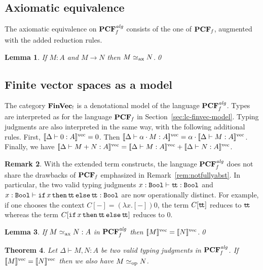 \documentclass[10pt]{article}
\theoremstyle{plain}
\newtheorem{theorem}{Theorem}
\newtheorem{lemma}[theorem]{Lemma}
\theoremstyle{definition}
\newtheorem{remark}[theorem]{Remark}
\newcommand{\entail}{\vdash}
\newcommand{\FinVec}{\mbox{\bf FinVec}}
\newcommand{\ttrue}{{\tt t}\!{\tt t}}
\newcommand{\ifterm}[3]{{{\tt if}\,{#1}\,{\tt then}\,{#2}\,{\tt else}\,{#3}}}
\newcommand{\bit}{{\tt Bool}}
\newcommand{\opeq}{\mathrel{\simeq_{\rm op}}}
\newcommand{\axeq}{\mathrel{\simeq_{\rm ax}}}
\newcommand{\fvdenot}[1]{{[\![{#1}]\!]^{\rm vec}}}
\begin{document}
\subsection{Axiomatic equivalence}

The axiomatic equivalence on ${\bf PCF}_{\it f}^{\it alg}$ consists of the one
of ${\bf PCF}_{\it f}$, augmented with the added reduction rules. 


\begin{lemma}
  \label{lem:opax-alg}
  If $M:A$ and $M\to N$ then $M\axeq N$.\qed
\end{lemma}




\subsection{Finite vector spaces as a model}
\label{sec:model-alglc}

The category $\FinVec_!$ is a denotational model of the language
${\bf PCF}_{\it f}^{\it alg}$. Types are interpreted as for the language
${\bf PCF}_{\it f}$ in Section~\ref{sec:lc-finvec-model}. Typing judgments are
also interpreted in the same way, with the following additional
rules. First,
$\fvdenot{\Delta\entail 0:A} = 0$. Then $\fvdenot{\Delta\entail \alpha\cdot M:A} = \alpha\cdot
  \fvdenot{\Delta\entail M:A}$. Finally, we have
$\fvdenot{\Delta\entail M+N:A} = \fvdenot{\Delta\entail M:A} + \fvdenot{\Delta\entail N:A}$.

\begin{remark}
With the extended term constructs, the language ${\bf PCF}_{\it f}^{\it alg}$
does not share the drawbacks of ${\bf PCF}_{\it f}$ emphasized in
Remark~\ref{rem:notfullyabst}. In particular, the two valid typing
judgments $ x:\bit\entail\ttrue:\bit $ and $
x:\bit\entail\ifterm{x}{\ttrue}{\ttrue}:\bit $ are now operationally
distinct. For example, if one chooses the context $C[-]=(\lambda x.[-])0$, the
term $C[\ttrue]$ reduces to $\ttrue$ whereas the term
$C[\ifterm{x}{\ttrue}{\ttrue}]$ reduces to $0$.
\end{remark}

\begin{lemma}
  \label{lem:axdenot-alg}
  If $M\axeq{}N:A$ in ${\bf PCF}_{\it f}^{\it alg}$ then $\fvdenot{M} =
  \fvdenot{N}$.\qed
\end{lemma}


\begin{theorem}
  \label{th:sound-alg}
  Let $\Delta\entail M,N:A$ be two valid typing judgments in
  ${\bf PCF}_{\it f}^{\it alg}$. If $\fvdenot{M}=\fvdenot{N}$ then we also have
  $M\opeq N$.
\end{theorem}
\end{document}
